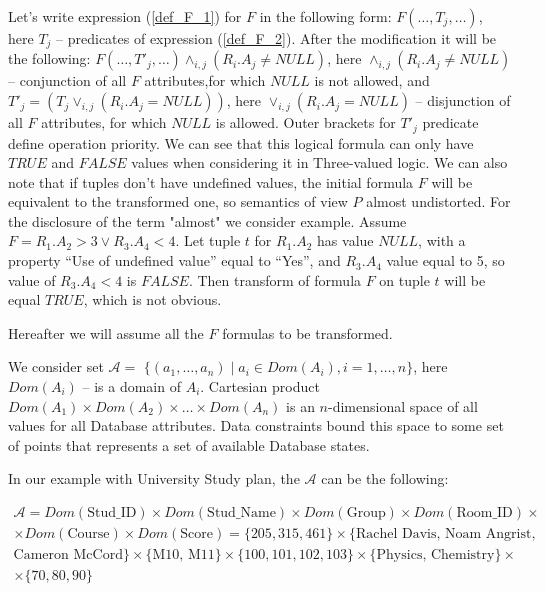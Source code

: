 \documentclass[prodmode,acmtods]{acmsmall} %
\def \n #1{\mathit{#1}}
\begin{document}
Let's write expression (\ref{def_F_1}) for $F$ in the following form: $ F (\dots
, T_j , \dots )$, here $T_j$ -- predicates of expression (\ref{def_F_2}). After
the modification it will be the following: $F( \dots, T'_j , \dots )\wedge_{i,j}
(R_i .A_j \neq \n{NULL})$, here $\wedge_{i,j}(R_i .A_j \neq \n{NULL})$
-- conjunction of all $F$ attributes,for which $\n{NULL}$ is not allowed, and
$T'_j = (T_j \vee_{i,j}(R_i .A_j = \n{NULL}))$, here $\vee_{i,j}(R_i .A_j =
\n{NULL})$ -- disjunction of all $F$ attributes, for which $\n{NULL}$ is allowed.
Outer brackets for $T'_j$ predicate define operation priority. We can see that
this logical formula can only have $\n{TRUE}$ and $\n{FALSE}$ values when
considering it in Three-valued logic. We can also note that if tuples don't have
undefined values, the initial formula $F$ will be equivalent to the transformed
one, so semantics of view $P$ almost undistorted. For the disclosure of the term
"almost" we consider example. Assume $F = R_1.A_2 > 3 \vee R_3.A_4 < 4$. Let
tuple $t$ for $R_1.A_2$ has value $\n{NULL}$, with a property ``Use of undefined
value'' equal to ``Yes'', and $R_3.A_4$ value equal to 5, so value of
$R_3.A_4 < 4$ is $\n{FALSE}$. Then transform of formula $F$ on tuple $t$ will be
equal $\n{TRUE}$, which is not obvious.

Hereafter we will assume all the $F$ formulas to be transformed.

We consider set $\mathcal{A} =$ $\{(a_1, \dots, a_n) \mid a_i \in Dom(A_i),
i=1,\dots,n\}$, here $Dom(A_i)$ -- is a domain of $A_i$. Cartesian product
$Dom(A_1)\times Dom(A_2)\times \dots \times Dom(A_n)$ is an $n$-dimensional
space of all values for all Database attributes. Data constraints bound this
space to some set of points that represents a set of available Database
states.

In our example with University Study plan, the $\mathcal{A}$ can be the
following:

\begin{multline*}
\mathcal{A} = Dom(\text{Stud\_ID})\times Dom(\text{Stud\_Name}) \times
Dom(\text{Group}) \times Dom(\text{Room\_ID}) \times\\
\times Dom(\text{Course}) \times Dom(\text{Score}) = \{205, 315, 461\} \times
\{\text{Rachel Davis, Noam Angrist},\\
\text{Cameron McCord}\} \times\{\text{M10, M11}\} \times \{100, 101, 102, 103\}
\times \{\text{Physics, Chemistry}\} \times\\ \times \{70, 80, 90\}
\end{multline*}
\end{document}
